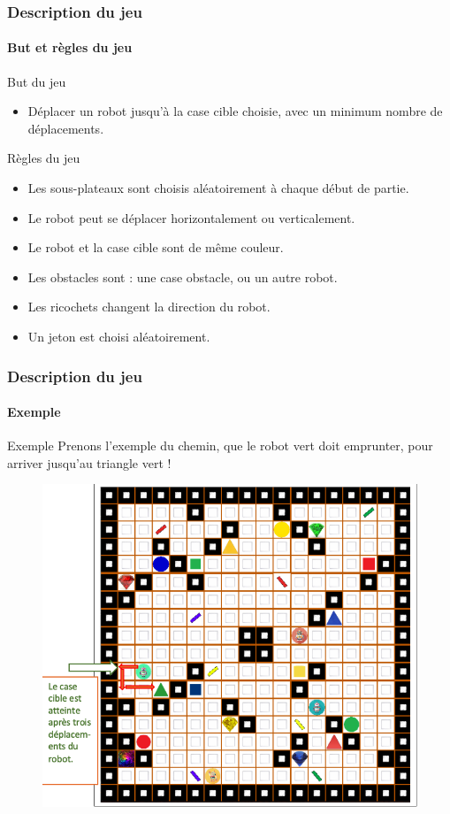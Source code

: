 \documentclass[t]{beamer}
\begin{document}
\begin{frame}
\frametitle{Description du jeu}
\framesubtitle{But et règles du jeu}
\begin{block}{But du jeu}  
\begin{itemize}
\item Déplacer un robot jusqu’à la case cible choisie, avec un minimum nombre de déplacements.
\end{itemize}
\end{block}
\begin{block}{Règles du jeu}  
 \begin{itemize}
\item Les sous-plateaux sont choisis aléatoirement à chaque début de partie.
\item Le robot peut se déplacer horizontalement ou verticalement.
\item Le robot et la case cible sont de même couleur.
\item Les obstacles sont : une case obstacle, ou un autre robot.
\item Les ricochets changent la direction du robot.
\item Un jeton est choisi aléatoirement.
\end{itemize}
\end{block}
\end{frame}



\begin{frame}
\frametitle{Description du jeu}
\framesubtitle{Exemple}
\begin{exampleblock}{Exemple } 
Prenons l'exemple du chemin, que le robot vert doit emprunter, pour arriver jusqu'au triangle vert !
\end{exampleblock}
\begin{center}
\begin{figure}[h!]
\centerline{\includegraphics[scale=0.24]{cheminEx.png}}
\end{figure}
\end{center}
\end{frame}
\end{document}
